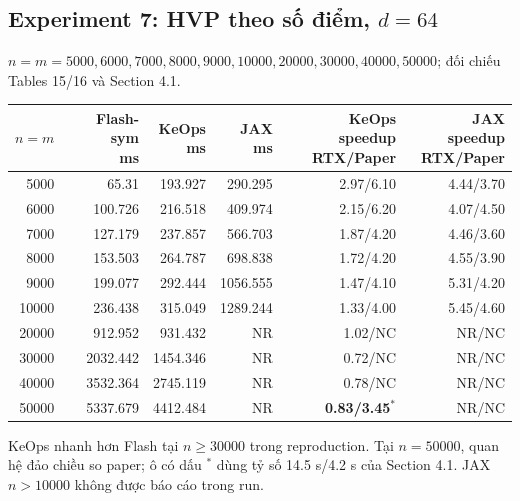 \documentclass[11pt,a4paper]{article}
\newcommand{\NR}{\textnormal{NR}}
\begin{document}
\subsection{Experiment 7: HVP theo số điểm, $d=64$}
$n=m=5000,6000,7000,8000,9000,10000,20000,30000,40000,50000$;
đối chiếu Tables 15/16 và Section 4.1.
\begin{center}\footnotesize
\setlength{\tabcolsep}{5pt}
\begin{tabular}{@{}rrrrrr@{}}
\toprule
$n=m$ & \shortstack{Flash-sym\\ms} & \shortstack{KeOps\\ms} & \shortstack{JAX\\ms} & \shortstack{KeOps speedup\\RTX/Paper} & \shortstack{JAX speedup\\RTX/Paper} \\
\midrule
5000 & 65.31 & 193.927 & 290.295 & 2.97/6.10 & 4.44/3.70 \\
6000 & 100.726 & 216.518 & 409.974 & 2.15/6.20 & 4.07/4.50 \\
7000 & 127.179 & 237.857 & 566.703 & 1.87/4.20 & 4.46/3.60 \\
8000 & 153.503 & 264.787 & 698.838 & 1.72/4.20 & 4.55/3.90 \\
9000 & 199.077 & 292.444 & 1056.555 & 1.47/4.10 & 5.31/4.20 \\
10000 & 236.438 & 315.049 & 1289.244 & 1.33/4.00 & 5.45/4.60 \\
20000 & 912.952 & 931.432 & \NR & 1.02/NC & \NR/NC \\
30000 & 2032.442 & 1454.346 & \NR & 0.72/NC & \NR/NC \\
40000 & 3532.364 & 2745.119 & \NR & 0.78/NC & \NR/NC \\
50000 & 5337.679 & 4412.484 & \NR & \textbf{0.83/3.45}$^{*}$ & \NR/NC \\
\bottomrule
\end{tabular}
\end{center}
KeOps nhanh hơn Flash tại $n\geq30000$ trong reproduction. Tại $n=50000$,
quan hệ đảo chiều so paper; ô có dấu $^{*}$ dùng tỷ số 14.5 s/4.2 s
của Section 4.1. JAX $n>10000$ không được báo cáo trong run.
\end{document}
